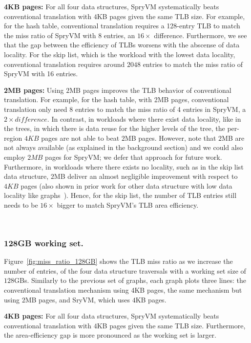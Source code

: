 \noindent\textbf{4KB pages:} For all four data structures, SpryVM systematically beats conventional translation with $4$KB pages given the same TLB size. For example, for the hash table, conventional translation requires a 128-entry TLB to match the miss ratio of SpryVM with 8 entries, an $16\times$ difference. Furthermore, we see that the gap between the efficiency of TLBs worsens with the abscense of data locality. For the skip list, which is the workload with the lowest data locality, conventional translation requires around $2048$ entries to match the miss ratio of SpryVM with 16 entries.

\noindent\textbf{2MB pages:} Using $2$MB pages improves the TLB behavior of conventional translation. For example, for the hash table, with 2MB pages, conventional translation only need 8 entries to match the miss ratio of 4 entries in SpryVM, a $2\times difference$. In contrast, in workloads where there exist data locality, like in the trees, in which there is data reuse for the higher levels of the tree, the per-region $4KB$ pages are not able to beat $2$MB pages. However, note that $2$MB are not always available (as explained in the background section) and we could also employ $2MB$ pages for SpryVM; we defer that approach for future work. Furthermore, in workloads where there exists no locality, such as in the skip list data structure, $2$MB deliver an almost negligible improvement with respect to $4KB$ pages (also shown in prior work for other data structure with low data locality like graphs~\cite{haria:devirtualizing}). Hence, for the skip list, the number of TLB entries still needs to be $16\times$ bigger to match SpryVM's TLB area efficiency.

~\subsubsection{128GB working set.} Figure~\ref{fig:miss_ratio_128GB} shows the TLB miss ratio as we increase the number of entries, of the four data structure traversals with a working set size of $128$GBs. Similarly to the previous set of graphs, each graph plots three lines: the conventional translation mechanism using 4KB pages, the same mechanism but using $2$MB pages, and SryVM, which uses $4$KB pages.

\noindent\textbf{4KB pages:} For all four data structures, SpryVM systematically beats conventional translation with $4$KB pages given the same TLB size. Furthermore, the area-efficiency gap is more pronounced as the working set is larger. 

